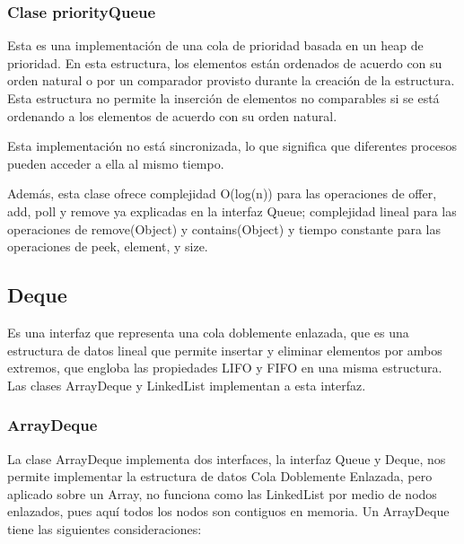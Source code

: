 \documentclass[11pt]{article}
\begin{document}
\subsubsection{Clase priorityQueue}

\par

Esta es una implementación de una cola de prioridad basada en un heap 
de prioridad. En esta estructura, los elementos están ordenados de 
acuerdo con su orden natural o por un comparador provisto durante la 
creación de la estructura.  Esta estructura no permite la inserción 
de elementos no comparables si se está ordenando a los elementos de 
acuerdo con su orden natural.

\par

Esta implementación no está sincronizada, lo que significa que 
diferentes procesos pueden acceder a ella al mismo tiempo.

\par

Además, esta clase ofrece complejidad O(log(n)) para las operaciones 
de offer, add, poll y remove ya explicadas en la interfaz Queue; 
complejidad lineal para las operaciones de remove(Object) y 
contains(Object) y tiempo constante para las operaciones de peek, 
element, y size.

\subsection{Deque}

\par

Es una interfaz que representa una cola doblemente enlazada, que es 
una estructura de datos lineal que permite insertar y eliminar 
elementos por ambos extremos, que engloba las propiedades LIFO y FIFO 
en una misma estructura. Las clases ArrayDeque y LinkedList 
implementan a esta interfaz. 

\subsubsection{ArrayDeque}

\par

La clase ArrayDeque implementa dos interfaces, la interfaz Queue y 
Deque, nos permite implementar la estructura de datos Cola Doblemente 
Enlazada, pero aplicado sobre un Array, no funciona como las 
LinkedList por medio de nodos enlazados, pues aquí todos los nodos 
son contiguos en memoria. Un ArrayDeque tiene las siguientes 
consideraciones:
\end{document}
